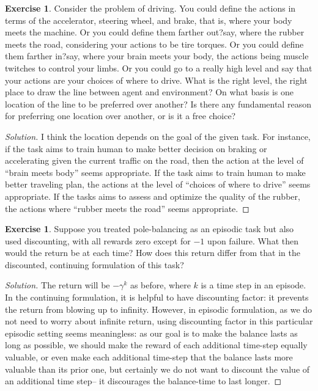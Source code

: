 \documentclass[oneside,11pt]{article}
\theoremstyle{definition}
\newtheorem{exer}[thm]{Exercise}
\newenvironment{solution}
{\renewcommand\qedsymbol{$\blacksquare$}\begin{proof}[Solution]} {\end{proof}}
\begin{document}
\begin{exer}
Consider the problem of driving. You could define the actions in terms of the accelerator, steering wheel, and brake, that is, where your body meets the machine. Or you could define them farther out?say, where the rubber meets the road, considering your actions to be tire torques. Or you could define them farther in?say, where your brain meets your body, the actions being muscle twitches to control your limbs. Or you could go to a really high level and say that your actions are your choices of where to drive. What is the right level, the right place to draw the line between agent and environment? On what basis is one location of the line to be preferred over another? Is there any fundamental reason for preferring one location over another, or is it a free choice?
\end{exer}


\begin{shaded}
\begin{solution}
I think the location depends on the goal of the given task. For instance, if the task aims to train human to make better  decision on braking or accelerating given the current traffic on the road, then the action at the level of ``brain meets body'' seems appropriate. If the task aims to train human to make better traveling plan, the actions at the level of ``choices of where to drive'' seems appropriate. If the tasks aims to assess and optimize the quality of the rubber, the actions where ``rubber meets the road'' seems appropriate.
\end{solution}
\end{shaded}



\begin{exer}
Suppose you treated pole-balancing as an episodic task but also used discounting, with all rewards zero except for $-1$ upon failure. What then would the return be at each time? How does this return differ from that in the discounted, continuing formulation of this task?
\end{exer}

\begin{shaded}
\begin{solution} 
The return will be $- \gamma^k$ as before, where $k$ is a time step in an episode. In the continuing formulation, it is helpful to have discounting factor: it prevents the return from blowing up to infinity. However, in episodic formulation, as we do not need to worry about infinite return, using discounting factor in this particular episodic setting seems meaningless: as our goal is to make the balance lasts as long as possible, we should make the reward of each additional time-step equally valuable, or even make each additional time-step that the balance lasts more valuable than its prior one, but certainly we do not want to discount the value of an additional time step-- it discourages the balance-time to last longer.
\end{solution}
\end{shaded}
\end{document}
